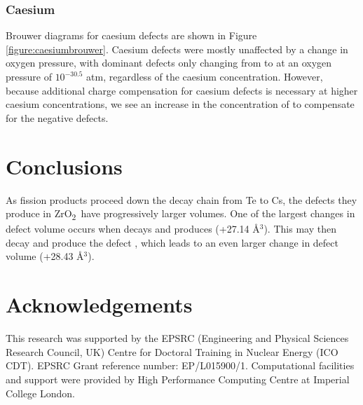 \documentclass[11pt,a4paper]{article}
\newcommand{\zirconia}{ZrO\textsubscript{2}}
\begin{document}
\subsubsection*{Caesium}

Brouwer diagrams for caesium defects are shown in Figure \ref{figure:caesiumbrouwer}. Caesium defects were mostly unaffected by a change in oxygen pressure, with dominant defects only changing from  to  at an oxygen pressure of $10^{-30.5}$ atm, regardless of the caesium concentration. However, because additional charge compensation for caesium defects is necessary at higher caesium concentrations, we see an increase in the concentration of  to compensate for the negative  defects.

\section*{Conclusions}

As fission products proceed down the decay chain from Te to Cs, the defects they produce in \zirconia\ have progressively larger volumes. One of the largest changes in defect volume occurs when  decays and produces  (+27.14 \r{A}$^{3}$). This may then decay and produce the defect , which leads to an even larger change in defect volume (+28.43 \r{A}$^{3}$).

\section*{Acknowledgements}

This research was supported by the EPSRC (Engineering and Physical Sciences Research Council, UK) Centre for Doctoral Training in Nuclear Energy (ICO CDT). EPSRC Grant reference number: EP/L015900/1. Computational facilities and support were provided by High Performance Computing Centre at Imperial College
London.


\clearpage

\label{References}




\appendix
\end{document}
